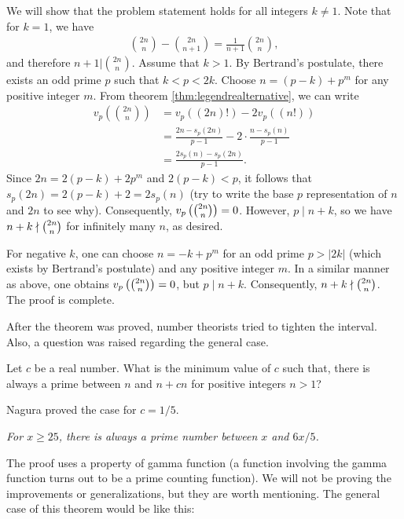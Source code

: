 \documentclass{subfile}
\begin{document}
	\begin{solution}
		We will show that the problem statement holds for all integers $k \neq 1$. Note that for $k=1$, we have
			\begin{align*}
				\binom{2n}{n} - \binom{2n}{n+1} = \frac{1}{n+1}\binom{2n}{n},
			\end{align*}
		and therefore $n+1 | \binom{2n}{n}$. Assume that $k>1$. By Bertrand's postulate, there exists an odd prime $p$ such that $k<p<2k$. Choose $n=(p-k)+p^m$ for any positive integer $m$. From theorem \eqref{thm:legendrealternative}, we can write
			\begin{align*}
				v_p \left(\binom{2n}n\right)  &=  v_p((2n)!) - 2v_p((n!))\\
				&=  \frac{2n - s_p(2n)}{p-1} - 2 \cdot \frac{n - s_p(n)}{p-1}\\
				&=   \frac{2s_p(n) - s_p(2n)}{p - 1}.
			\end{align*}
		Since $2n = 2(p - k) + 2p^m$ and $2(p - k) < p$, it follows that $s_p(2n) = 2(p - k) + 2 = 2s_p(n)$ (try to write the base $p$ representation of $n$ and $2n$ to see why). Consequently, $v_p\left(\tbinom{2n}{n}\right) = 0$. However, $p \mid n + k$, so we have $n + k \nmid \tbinom{2n}{n}$ for infinitely many $n$, as desired.
		
		For negative $k$, one can choose $n = -k + p^m$ for an odd prime $p > |2k|$ (which exists by Bertrand's postulate) and any positive integer $m$. In a similar manner as above, one obtains $v_p\left(\tbinom{2n}{n}\right) = 0$, but $p \mid n + k$. Consequently, $n + k \nmid \tbinom{2n}{n}$. The proof is complete.
	\end{solution}
After the theorem was proved, number theorists tried to tighten the interval. Also, a question was raised regarding the general case.
	\begin{problem}
		Let $c$ be a real number. What is the minimum value of $c$ such that, there is always a prime between $n$ and $n+cn$ for positive integers $n>1$?
	\end{problem}
Nagura \cite{nagura} proved the case for $c=1/5$.
	\begin{theorem}[Nagura]\slshape
		For $x\geq25$, there is always a prime number between $x$ and $6x/5$.
	\end{theorem}
The proof uses a property of gamma function (a function involving the gamma function turns out to be a prime counting function). We will not be proving the improvements or generalizations, but they are worth mentioning. The general case of this theorem would be like this:
\end{document}
